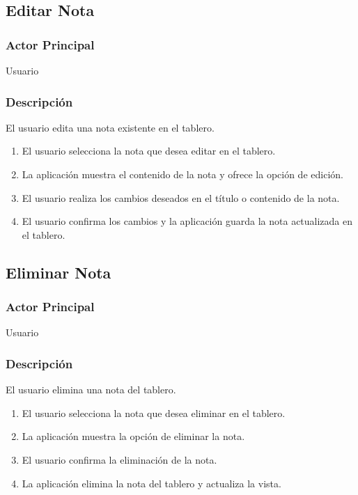 \subsection{Editar Nota}
\subsubsection{Actor Principal}
Usuario

\subsubsection{Descripción}
El usuario edita una nota existente en el tablero.

\begin{enumerate}
  \item El usuario selecciona la nota que desea editar en el tablero.
  \item La aplicación muestra el contenido de la nota y ofrece la opción de edición.
  \item El usuario realiza los cambios deseados en el título o contenido de la nota.
  \item El usuario confirma los cambios y la aplicación guarda la nota actualizada en el tablero.
\end{enumerate}

\subsection{Eliminar Nota}
\subsubsection{Actor Principal}
Usuario

\subsubsection{Descripción}
El usuario elimina una nota del tablero.

\begin{enumerate}
  \item El usuario selecciona la nota que desea eliminar en el tablero.
  \item La aplicación muestra la opción de eliminar la nota.
  \item El usuario confirma la eliminación de la nota.
  \item La aplicación elimina la nota del tablero y actualiza la vista.
\end{enumerate}

